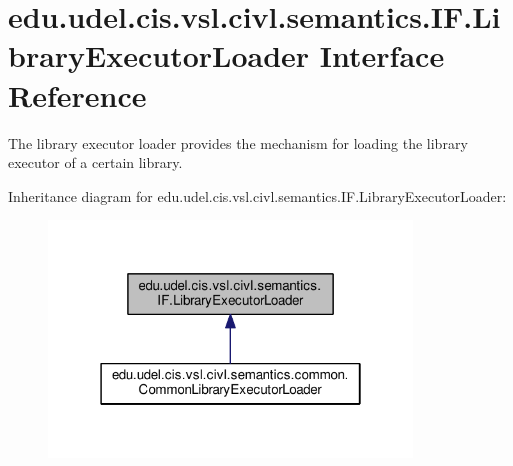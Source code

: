 \hypertarget{interfaceedu_1_1udel_1_1cis_1_1vsl_1_1civl_1_1semantics_1_1IF_1_1LibraryExecutorLoader}{}\section{edu.\+udel.\+cis.\+vsl.\+civl.\+semantics.\+I\+F.\+Library\+Executor\+Loader Interface Reference}
\label{interfaceedu_1_1udel_1_1cis_1_1vsl_1_1civl_1_1semantics_1_1IF_1_1LibraryExecutorLoader}


The library executor loader provides the mechanism for loading the library executor of a certain library.  




Inheritance diagram for edu.\+udel.\+cis.\+vsl.\+civl.\+semantics.\+I\+F.\+Library\+Executor\+Loader\+:
\nopagebreak
\begin{figure}[H]
\begin{center}
\leavevmode
\includegraphics[width=274pt]{interfaceedu_1_1udel_1_1cis_1_1vsl_1_1civl_1_1semantics_1_1IF_1_1LibraryExecutorLoader__inherit__graph}
\end{center}
\end{figure}

